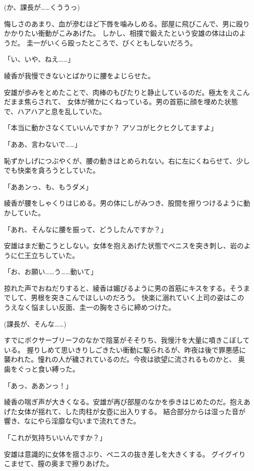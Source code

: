 ﻿\documentclass[
    book,tate,
    line_length=30zw,
    jafontsize=12pt,
    paper=b5j,
    landscape,
    ]{jlreq}
\begin{document}
(か、課長が……くううっ)

悔しさのあまり、血が滲むほど下唇を噛みしめる。部屋に飛びこんで、男に殴りかかりたい衝動がこみあげた。
しかし、相撲で鍛えたという安雄の体は山のようだ。 圭一がいくら殴ったところで、びくともしないだろう。

「い、いや、ねえ……」

綾香が我慢できないとばかりに腰をよじらせた。

安雄が歩みをとめたことで、肉棒のもぴたりと静止しているのだ。極太をえこんだまま焦らされて、
女体が微かにくねっている。男の首筋に顔を埋めた状態で、ハアハアと息を乱していた。

「本当に動かさなくていいんですか？ アソコがヒクヒクしてますよ」

「ああ、言わないで……」

恥ずかしげにつぶやくが、腰の動きはとめられない。右に左にくねらせて、少しでも快楽を貪ろうとしていた。

「ああンっ、も、もうダメ」

綾香が腰をしゃくりはじめる。男の体にしがみつき、股間を擦りつけるように動かしていた。

「あれ、そんなに腰を振って、どうしたんですか？」

安雄はまだ動こうとしない。女体を抱えあげた状態でペニスを突き刺し、岩のように仁王立ちしていた。

「お、お願い……う……動いて」

掠れた声でおねだりすると、綾香は媚びるように男の首筋にキスをする。そうまでして、男根を突きこんでほしいのだろう。
快楽に溺れていく上司の姿はこのうえなく悩ましい反面、圭一の胸をさらに締めつけた。

(課長が、そんな……)

すでにボクサーブリーフのなかで陰茎がそそりち、我慢汁を大量に噴きこぼしている。
握りしめて思いきりしごきたい衝動に駆られるが、昨夜は後で罪悪感に襲われた。憧れの人が穢されているのだ。今夜は欲望に流されるものかと、
奥歯をぐっと食い縛った。

「あっ、ああンっ！」

綾香の喘ぎ声が大きくなる。安雄が再び部屋のなかを歩きはじめたのだ。抱えあげた女体が揺れて、した肉柱が女壺に出入りする。
結合部分からは湿った音が響き、なにやら淫靡な匂いまで流れてきた。

「これが気持ちいいんですか？」

安雄は意識的に女体を揺さぶり、ペニスの抜き差しを大きくする。 グイグイりこませて、膣の奥まで擦りあげた。
\end{document}
